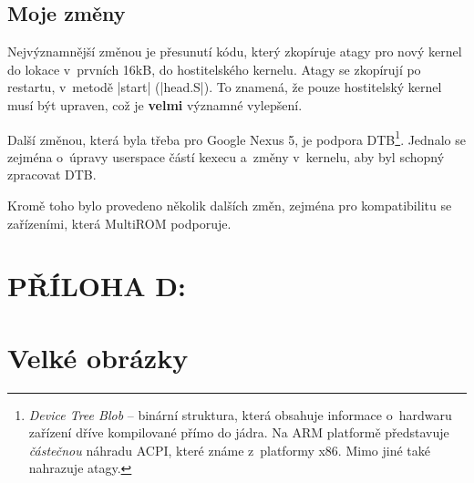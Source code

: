 \documentclass[12pt, a4paper, oneside]{article}
\newcommand{\B}{\textbf} %
\newcommand{\It}{\textit}  %
\begin{document}
\subsection*{Moje změny}
Nejvýznamnější změnou je přesunutí kódu, který zkopíruje atagy pro nový kernel do lokace v~prvních 16kB, do hostitelského kernelu. Atagy se zkopírují po restartu, v~metodě |start| (|head.S|). To znamená, že pouze hostitelský kernel musí být upraven, což je \B{velmi} významné vylepšení.

Další změnou, která byla třeba pro Google Nexus 5, je podpora DTB\footnote{\It{Device Tree Blob} -- binární struktura, která obsahuje informace o~hardwaru zařízení dříve kompilované přímo do jádra. Na ARM platformě představuje \It{částečnou} náhradu ACPI, které známe z~platformy x86. Mimo jiné také nahrazuje atagy.}. Jednalo se zejména o~úpravy userspace částí kexecu a~změny v~kernelu, aby byl schopný zpracovat DTB.

Kromě toho bylo provedeno několik dalších změn, zejména pro kompatibilitu se zařízeními, která MultiROM podporuje.


\newpage
\voffset=-80pt
\addtolength{\textheight}{70pt}
\addtolength{\footskip}{70pt}
 \section*{PŘÍLOHA D:}
 \section*{Velké obrázky}
 \label{obrazky}
\end{document}
